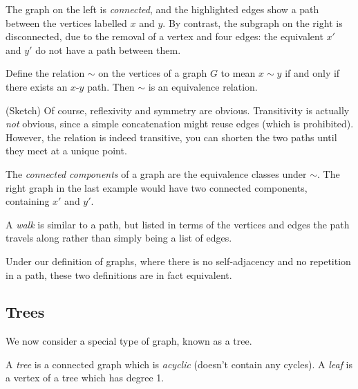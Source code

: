 \documentclass{article}
\begin{document}
\begin{example}[Connectedness]
    The graph on the left is \textit{connected}, and the highlighted edges show a path between the vertices labelled $x$ and $y$. By contrast, the subgraph on the right is disconnected, due to the removal of a vertex and four edges: the equivalent $x'$ and $y'$ do not have a path between them.

\end{example}

\begin{proposition}
	Define the relation $\sim$ on the vertices of a graph $G$ to mean $x \sim y$ if and only if there exists an $x$-$y$ path. Then $\sim$ is an equivalence relation.
\end{proposition}

\begin{prf}
	(Sketch) Of course, reflexivity and symmetry are obvious. Transitivity is actually \textit{not} obvious, since a simple concatenation might reuse edges (which is prohibited). However, the relation is indeed transitive, you can shorten the two paths until they meet at a unique point.
\end{prf}

The \textit{connected components} of a graph are the equivalence classes under $\sim$. The right graph in the last example would have two connected components, containing $x'$ and $y'$.

\begin{definition}[Walk]
	\label{walk-definition}
    A \textit{walk} is similar to a path, but listed in terms of the vertices and edges the path travels along rather than simply being a list of edges.
    
    Under our definition of graphs, where there is no self-adjacency and no repetition in a path, these two definitions are in fact equivalent.
\end{definition}


\subsection{Trees}

We now consider a special type of graph, known as a tree.

\begin{definition}[Tree]
	A \textit{tree} is a connected graph which is \textit{acyclic} (doesn't contain any cycles). A \textit{leaf} is a vertex of a tree which has degree 1.

\end{definition}
\end{document}

